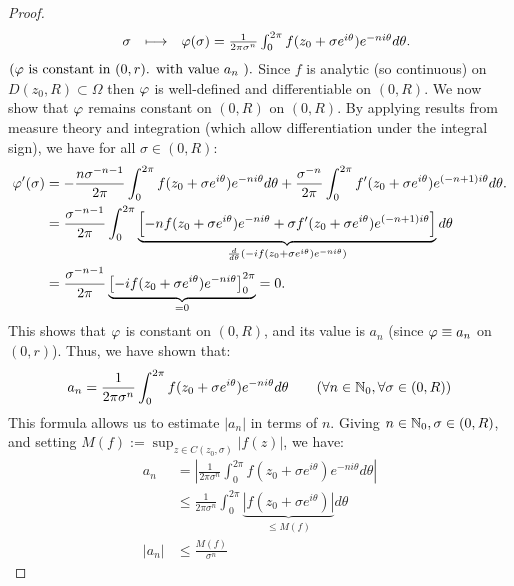 \begin{proof}
\[\begin{array}{cccl}
           &  \sigma     & \longmapsto     & \varphi(\sigma   ) = 
           \frac{1}{2\pi  \sigma ^n   } \int_{0}^{2\pi } f(z_0 + \sigma e^{i \theta}  ) e^{-ni\theta} d\theta.\\ 
\end{array}
\]
$(\varphi \text{ is constant in $(0, r) $. with value $a_n$ } ). $  Since $f$ is analytic (so continuous) on 
$D(z_0, R) \subset \Omega$  then $\varphi$ is well-defined and differentiable on $(0, R) $. We now show that 
$\varphi$ remains constant on $(0, R)$ on $(0, R).$ By applying results from measure theory 
and integration (which allow differentiation under the integral sign), we have for all $\sigma  \in  (0, R):$ 
\begin{align*}
  \varphi'(\sigma   ) 
  &= - \frac{n \sigma ^{-n-1}  }{2\pi } \int_{0}^{2\pi } f(z_0 + \sigma e^{i \theta}  ) e^{-n i \theta}d \theta + 
  \frac{\sigma ^{-n}  }{2\pi }
  \int_{0 }^{2\pi } f'(z_0 + \sigma  e^{i \theta}  ) e^{(-n + 1) i \theta} d \theta. \\
  &= \frac{\sigma ^{-n-1}  }{2 \pi }
  \int_{0}^{2\pi } 
  \underbrace{
  \left[ -n f(z_0 + \sigma  e^{i \theta}  ) e^{-ni\theta} + 
  \sigma  f'(z_0 + \sigma  e^{i\theta}  ) e^{(-n + 1) i \theta}  \right]
  }_{\frac{d }{d \theta} ( -i f (z_0 + \sigma  e^{i \theta}  ) e^{-n i \theta}) } 
  d 
  \theta \\
  &= 
  \frac{\sigma ^{-n-1}  }{2 \pi  }
    \underbrace{
  \left[ 
  -if(z_0 + \sigma e^{i \theta}  ) e^{-n i \theta} 
  \right]_{0}^{2\pi } 
    }_{ = 0} 
  = 0.
\end{align*}
This shows that $\varphi$ is constant on $(0, R)$, and its value is $a_n $ (since $\varphi \equiv a_n $ on $(0, r)$). Thus,
we have shown that:
\[
a_n  = \frac{1}{2\pi \sigma ^n   } \int_{
0}^{2\pi } f(z_0 + \sigma  e^{i \theta}  ) e^{-n i \theta} d \theta
\quad \quad 
( \forall  n \in  \mathbb{N}_0, \forall \sigma  \in  (0, R)  ) 
\]
This formula allows us to estimate $\left| a_n  \right|  $ in terms of $n$. Giving $n \in  \mathbb{N}_0, \sigma  \in  (0, R)$, and 
setting $M(f)  := \sup_{z \in   C(z_0, \sigma   ) } \left| f(z)  \right|$, we have:
\begin{align*}
  a_n  &= 
  \left| \frac{1}{2\pi \sigma ^n   }\int_{0}^{2\pi } 
  f(z_0 + \sigma  e^{i\theta}  ) e^{-n i \theta}d \theta\right|   \\
       & \leq 
       \frac{1}{2\pi  \sigma ^n   } 
       \int_{0}^{2\pi } 
       \underbrace{
         \left| f(z_0 + \sigma e^{i \theta}  )  \right|  
       }_{ \leq  M(f) } d \theta\\
        \left| a_n  \right|  & \leq \frac{M(f) }{\sigma ^n   } \quad 

\end{align*}
\end{proof}

